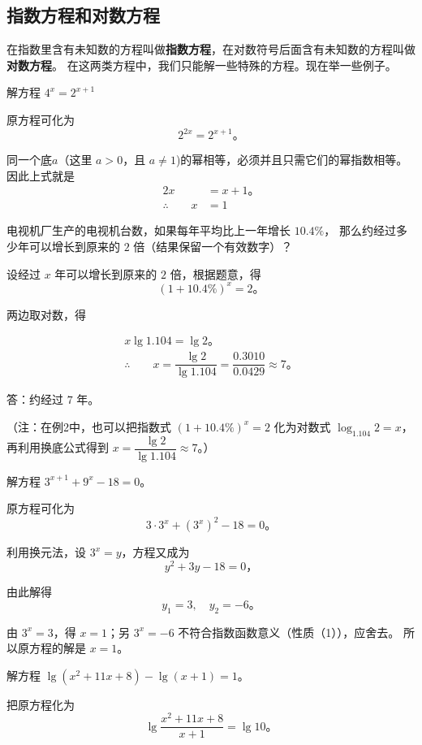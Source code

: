 \subsection{指数方程和对数方程}\label{subsec:1-14}

在指数里含有未知数的方程叫做\textbf{指数方程}，在对数符号后面含有未知数的方程叫做\textbf{对数方程}。
在这两类方程中，我们只能解一些特殊的方程。现在举一些例子。

\liti 解方程 $4^x = 2^{x+1}$

\jie 原方程可化为
$$2^{2x} = 2^{x+1} \text{。}$$

同一个底$a$（这里 $a > 0$，且 $a \neq 1$)的幂相等，必须并且只需它们的幂指数相等。因此上式就是
\begin{align*}
    2x &= x + 1 \text{。} \\
    \therefore \qquad x &= 1
\end{align*}

\liti 电视机厂生产的电视机台数，如果每年平均比上一年增长 $10.4\%$，
那么约经过多少年可以增长到原来的 $2$ 倍（结果保留一个有效数字）？

\jie 设经过 $x$ 年可以增长到原来的 $2$ 倍，根据题意，得
$$(1 +10.4\%)^x = 2 \text{。}$$

两边取对数，得

\begin{gather*}
    x \lg 1.104 = \lg 2 \text{。} \\
    \therefore \qquad x = \dfrac {\lg 2}{\lg 1.104} = \dfrac {0.3010}{0.0429} \approx 7 \text{。}
\end{gather*}

答：约经过 $7$ 年。

（注：在例2中，也可以把指数式 $(1 + 10.4\%)^x = 2$ 化为对数式 $\log_{1.104} 2 = x$，
再利用换底公式得到 $x = \dfrac {\lg 2}{\lg 1.104} \approx 7$。）
\vspace{0.5em}

\liti 解方程 $3^{x+1} + 9^x -18 = 0$。

\jie 原方程可化为
$$3 \cdot 3^x + (3^x)^2 - 18 = 0 \text{。}$$

利用换元法，设 $3^x = y$，方程又成为
$$y^2 + 3y - 18 = 0 \text{，}$$

由此解得
$$y_1 = 3, \quad y_2 = -6 \text{。}$$

由 $3^x = 3$，得 $x = 1$；另 $3^x = -6$ 不符合指数函数意义（性质（1）），应舍去。
所以原方程的解是 $x = 1$。

\liti 解方程 $\lg (x^2 + 11x + 8) - \lg (x + 1) = 1$。

\jie 把原方程化为
$$\lg \dfrac{x^2 + 11x + 8}{x + 1} = \lg 10 \text{。}$$

